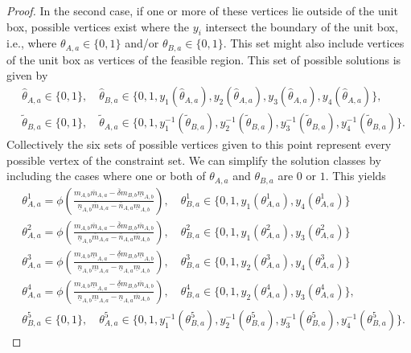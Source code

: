 \documentclass[letterpaper]{article} %
\begin{document}
\begin{proof}
In the second case, if one or more of these vertices lie outside of the unit box, possible vertices exist where the $y_i$ intersect the boundary of the unit box, i.e., where $\theta_{A,a} \in \{0,1\}$ and/or $\theta_{B,a} \in \{0,1\}$. This set might also include vertices of the unit box as vertices of the feasible region. This set of possible solutions is given by
\begin{align*}
    &\widehat\theta_{A,a} \in \{0,1\}, \quad \widehat\theta_{B,a} \in \{0,1, y_1(\widehat\theta_{A,a}), y_2(\widehat\theta_{A,a}), y_3(\widehat\theta_{A,a}), y_4(\widehat\theta_{A,a})\}, \\
    &\widetilde\theta_{B,a} \in \{0,1\}, \quad \widetilde\theta_{A,a} \in \{0, 1, y_1^{-1}(\widetilde\theta_{B,a}), y_2^{-1}(\widetilde\theta_{B,a}), y_3^{-1}(\widetilde\theta_{B,a}), y_4^{-1}(\widetilde\theta_{B,a})\}.
\end{align*}
Collectively the six sets of possible vertices given to this point represent every possible vertex of the constraint set. We can simplify the solution classes by including the cases where one or both of $\theta_{A,a}$ and $\theta_{B,a}$ are $0$ or $1$. This yields
\begin{align*}
    &\theta_{A,a}^1 = \phi\left( \frac{m_{A,b}\overline{m}_{A,a} - \overline{\delta}m_{B,b}\underline{m}_{A,b}}
    {\underline{n}_{A,b}\overline{m}_{A,a} - \overline{n}_{A,a}\underline{m}_{A,b}} \right), \quad
    \theta_{B,a}^1 \in \{0, 1, y_1(\theta_{A,a}^1), y_4(\theta_{A,a}^1)\} \\
    &\theta_{A,a}^2 = \phi\left( \frac{m_{A,b}\overline{m}_{A,a} - \overline{\delta}m_{B,b}\overline{m}_{A,b}}
    {\underline{n}_{A,b}\overline{m}_{A,a} - \overline{n}_{A,a}\overline{m}_{A,b}}\right), \quad
    \theta_{B,a}^2 \in \{0, 1, y_1(\theta_{A,a}^2), y_3(\theta_{A,a}^2)\}\\
    &\theta_{A,a}^3 = \phi\left( \frac{m_{A,b}\underline{m}_{A,a} - \underline{\delta}m_{B,b}\underline{m}_{A,b}}
    {\underline{n}_{A,b}\underline{m}_{A,a} - \underline{n}_{A,a}\underline{m}_{A,b}}\right), \quad
    \theta_{B,a}^3 \in \{0, 1, y_2(\theta_{A,a}^3), y_4(\theta_{A,a}^3)\}\\
    &\theta_{A,a}^4 = \phi\left( \frac{m_{A,b}\underline{m}_{A,a} - \underline{\delta}m_{B,b}\overline{m}_{A,b}}
    {\underline{n}_{A,b}\underline{m}_{A,a} - \underline{n}_{A,a}\overline{m}_{A,b}} \right), \quad
    \theta_{B,a}^4 \in \{0, 1, y_2(\theta_{A,a}^4), y_3(\theta_{A,a}^4)\}, \\
    &\theta_{B,a}^5 \in \{0,1\}, \quad
    \theta_{A,a}^5 \in \{0, 1, y_1^{-1}(\theta_{B,a}^5), y_2^{-1}(\theta_{B,a}^5), y_3^{-1}(\theta_{B,a}^5), y_4^{-1}(\theta_{B,a}^5)\}.

\end{align*}
\end{proof}
\end{document}
